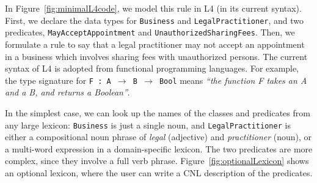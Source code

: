 \documentclass[11pt]{article}
\begin{document}
In Figure~\ref{fig:minimalL4code}, we model this rule in L4 (in its current syntax).
First, we declare the data types for {\small \texttt{Business}} and {\small \texttt{LegalPractitioner}}, and two predicates, {\small \texttt{MayAcceptAppointment}} and {\small \texttt{UnauthorizedSharingFees}}. 
Then, we formulate a rule to say that a legal practitioner may not accept an appointment in a business which involves sharing fees with unauthorized persons. The current syntax of L4 is adopted from functional programming languages.
For example, the type signature for {\small \texttt{F : A~$\rightarrow$~B $\rightarrow$ Bool}} means \textit{``the function F takes an A and a B, and returns a Boolean''}.




In the simplest case, we can look up the names of the classes and predicates from any large lexicon: 
{\small \texttt{Business}} is just a single noun, 
and {\small \texttt{LegalPractitioner}} is either a compositional noun phrase of \textit{legal} (adjective) and  \textit{practitioner} (noun), or a multi-word expression in a domain-specific lexicon. %
The two predicates are more complex, since they involve a full verb phrase. Figure~\ref{fig:optionalLexicon} shows  an optional lexicon, where the user can write a CNL description of the predicates. 
\end{document}
